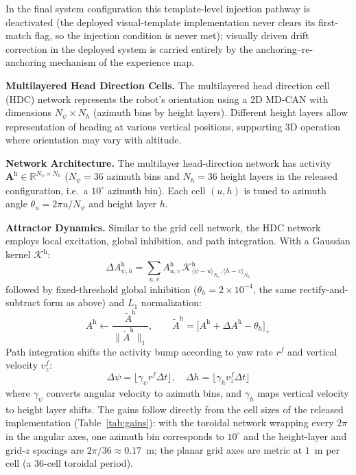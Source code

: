 In the final system configuration this template-level injection pathway is deactivated (the deployed visual-template implementation never clears its first-match flag, so the injection condition is never met); visually driven drift correction in the deployed system is carried entirely by the anchoring--re-anchoring mechanism of the experience map.

\textbf{Multilayered Head Direction Cells.} The multilayered head direction cell (HDC) network represents the robot's orientation using a 2D MD-CAN with dimensions $N_\psi \times N_h$ (azimuth bins by height layers). Different height layers allow representation of heading at various vertical positions, supporting 3D operation where orientation may vary with altitude.

\textbf{Network Architecture.} The multilayer head-direction network has activity $\mathbf{A}^\mathrm{h} \in \mathbb{R}^{N_\psi \times N_h}$ ($N_\psi = 36$ azimuth bins and $N_h = 36$ height layers in the released configuration, i.e.\ a $10^{\circ}$ azimuth bin). Each cell $(u, h)$ is tuned to azimuth angle $\theta_u = 2\pi u / N_\psi$ and height layer $h$.

\textbf{Attractor Dynamics.} Similar to the grid cell network, the HDC network employs local excitation, global inhibition, and path integration. With a Gaussian kernel $\mathcal{K}^\mathrm{h}$:
\begin{equation}
    \Delta A^\mathrm{h}_{\psi,h}=\sum_{u,v}A^\mathrm{h}_{u,v}\,\mathcal{K}^\mathrm{h}_{\langle \psi-u\rangle_{N_\psi},\langle h-v\rangle_{N_h}}
\end{equation}
followed by fixed-threshold global inhibition ($\theta_h = 2\times10^{-4}$, the same rectify-and-subtract form as above) and $L_1$ normalization:
\begin{equation}
    A^\mathrm{h}\leftarrow \frac{\tilde{A}^\mathrm{h}}{\lVert \tilde{A}^\mathrm{h}\rVert_1},\qquad \tilde{A}^\mathrm{h}=\big[A^\mathrm{h}+\Delta A^\mathrm{h}-\theta_h\big]_+
\end{equation}
Path integration shifts the activity bump according to yaw rate $r^f$ and vertical velocity $v^f_z$:
\begin{equation}
    \Delta\psi=\lfloor \gamma_\psi r^f \Delta t\rfloor,\quad \Delta h=\lfloor \gamma_h v^f_z \Delta t\rfloor
\end{equation}
where $\gamma_\psi$ converts angular velocity to azimuth bins, and $\gamma_h$ maps vertical velocity to height layer shifts. The gains follow directly from the cell sizes of the released implementation (Table~\ref{tab:gains}): with the toroidal network wrapping every $2\pi$ in the angular axes, one azimuth bin corresponds to $10^{\circ}$ and the height-layer and grid-$z$ spacings are $2\pi/36\approx0.17$~m; the planar grid axes are metric at $1$~m per cell (a 36-cell toroidal period).

